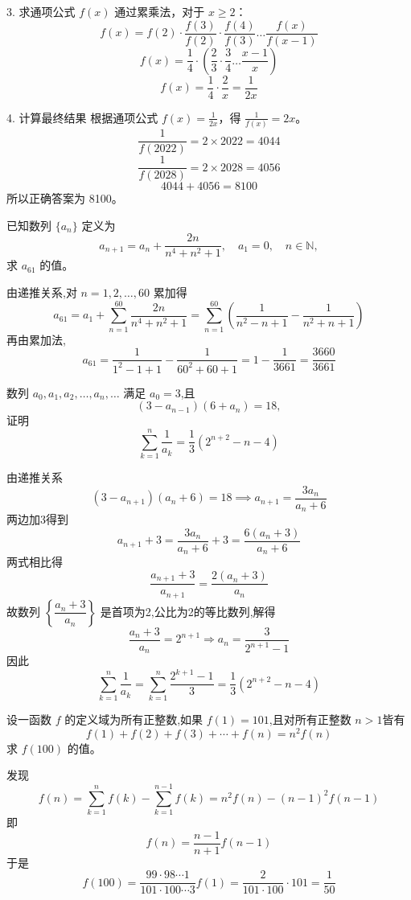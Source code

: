 \begin{questions}
\begin{solution}
3. 求通项公式 $f(x)$
通过累乘法，对于 $x \geq 2$：
\[ f(x) = f(2) \cdot \frac{f(3)}{f(2)} \cdot \frac{f(4)}{f(3)} \dots \frac{f(x)}{f(x-1)} \]
\[ f(x) = \frac{1}{4} \cdot \left( \frac{2}{3} \cdot \frac{3}{4} \dots \frac{x-1}{x} \right) \]
\[ f(x) = \frac{1}{4} \cdot \frac{2}{x} = \frac{1}{2x} \]

4. 计算最终结果
根据通项公式 $f(x) = \frac{1}{2x}$，得 $\frac{1}{f(x)} = 2x$。
\[ \frac{1}{f(2022)} = 2 \times 2022 = 4044 \]
\[ \frac{1}{f(2028)} = 2 \times 2028 = 4056 \]
\[ 4044 + 4056 = 8100 \]
所以正确答案为 8100。
\end{solution}

    \question 已知数列 $\{a_n\}$ 定义为
    \[
    a_{n+1} = a_n + \frac{2n}{n^4 + n^2 + 1}, \quad a_1 = 0, \quad n \in \mathbb{N},
    \]
    求 $a_{61}$ 的值。
    \begin{solution}
        由递推关系,对 $n = 1, 2, \dots, 60$ 累加得
        \[
        a_{61} = a_1 + \sum_{n=1}^{60} \frac{2n}{n^4 + n^2 + 1} = \sum_{n=1}^{60} \left(\frac{1}{n^2 - n + 1} - \frac{1}{n^2 + n + 1}\right)
        \]
        再由累加法,
        \[
        a_{61} = \frac{1}{1^2 - 1 + 1} - \frac{1}{60^2 + 60 + 1} = 1 - \frac{1}{3661} = \frac{3660}{3661}
        \]
    \end{solution}

    \question 数列 \(a_0, a_1, a_2, \ldots, a_n, \ldots\) 满足 \(a_0 = 3\),且
    \[
    (3 - a_{n-1})(6 + a_n) = 18,
    \]
    证明
    \[
    \sum_{k=1}^n \frac{1}{a_k} = \frac{1}{3}\left(2^{n+2}-n-4\right)
    \]
    \begin{solution}
        由递推关系
        \begin{equation}
            (3-a_{n+1})(a_n+6) = 18 \implies a_{n+1} = \frac{3a_n}{a_n+6}
        \end{equation}
        两边加3得到
        \begin{equation}
            a_{n+1}+3 = \frac{3a_n}{a_n+6}+3 = \frac{6(a_n+3)}{a_n+6}
        \end{equation}
        两式相比得
        \[
        \frac{a_{n+1}+3}{a_{n+1}} =  \frac{2(a_n+3)}{a_n}
        \]
        故数列 $\left\{\dfrac{a_n+3}{a_n}\right\}$ 是首项为2,公比为2的等比数列,解得
        \[
        \frac{a_n+3}{a_n} = 2^{n+1} \Rightarrow a_n = \frac{3}{2^{n+1}-1}
        \]
        因此
        \[
        \sum_{k=1}^n \frac{1}{a_k} = \sum_{k=1}^n \frac{2^{k+1}-1}{3} = \frac{1}{3}\left(2^{n+2}-n-4\right)
        \]
    \end{solution}
        
    \question 设一函数 $f$ 的定义域为所有正整数,如果 $f(1) = 101$,且对所有正整数 $n > 1$皆有  
    \[
    f(1) + f(2) + f(3) + \cdots + f(n) = n^2 f(n)
    \]  
    求 $f(100)$ 的值。
    \begin{solution}
        发现
        \[
        f(n) = \sum_{k=1}^n f(k)-\sum_{k=1}^{n-1} f(k)=n^2 f(n) - (n - 1)^2 f(n - 1)
        \]
        即
        \[
        f(n) = \frac{n - 1}{n + 1} f(n - 1)
        \]
        于是
        \[
        f(100) = \frac{99 \cdot 98 \cdots 1}{101 \cdot 100 \cdots 3} f(1) = \frac{2}{101 \cdot 100} \cdot 101 = \frac{1}{50}
        \]
    \end{solution}
    

\end{questions}
